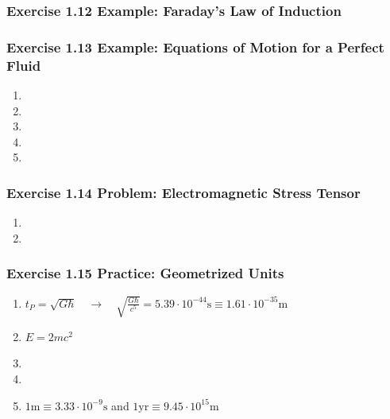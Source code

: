 \documentclass[10pt,a4paper]{article}
\theoremstyle{definition}
\begin{document}
\subsubsection{Exercise 1.12 Example: Faraday’s Law of Induction}

\subsubsection{Exercise 1.13 Example: Equations of Motion for a Perfect Fluid}
\begin{enumerate}[label=(\alph*)]
\item 
\item
\item
\item
\item
\end{enumerate}

\subsubsection{Exercise 1.14 Problem: Electromagnetic Stress Tensor}
\begin{enumerate}[label=(\alph*)]
\item
\item
\end{enumerate}

\subsubsection{Exercise 1.15 Practice: Geometrized Units}
\begin{enumerate}[label=(\alph*)]
\item $t_P=\sqrt{G\hbar}\quad\rightarrow\quad\sqrt{\frac{G\hbar}{c^5}}= 5.39\cdot10^{-44}\text{s}\equiv 1.61\cdot10^{-35}\text{m}$
\item $E=2mc^2$
\item 
\item 
\item $1\text{m}\equiv 3.33\cdot10^{-9}\text{s}$ and $1\text{yr}\equiv 9.45\cdot10^{15}\text{m}$
\end{enumerate}
\end{document}
